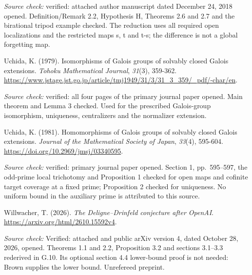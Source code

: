 \documentclass[10pt,a4paper]{article}
\begin{document}
\emph{Source check:} verified: attached author manuscript dated December 24, 2018 opened. Definition/Remark 2.2, Hypothesis H, Theorems 2.6 and 2.7 and the birational tripod example checked. The reduction uses all required open localizations and the restricted maps s, t and t-s; the difference is not a global forgetting map.

Uchida, K. (1979). Isomorphisms of Galois groups of solvably closed Galois extensions. \emph{Tohoku Mathematical Journal}, \emph{31}(3), 359-362. \url{https://www.jstage.jst.go.jp/article/tmj1949/31/3/31_3_359/_pdf/-char/en}.

\emph{Source check:} verified: all four pages of the primary journal paper opened. Main theorem and Lemma 3 checked. Used for the prescribed Galois-group isomorphism, uniqueness, centralizers and the normalizer extension.

Uchida, K. (1981). Homomorphisms of Galois groups of solvably closed Galois extensions. \emph{Journal of the Mathematical Society of Japan}, \emph{33}(4), 595-604. \url{https://doi.org/10.2969/jmsj/03340595}.

\emph{Source check:} verified: primary journal paper opened. Section 1, pp.~595--597, the odd-prime local trichotomy and Proposition 1 checked for open maps and cofinite target coverage at a fixed prime; Proposition 2 checked for uniqueness. No uniform bound in the auxiliary prime is attributed to this source.

Willwacher, T. (2026). \emph{The Deligne--Drinfeld conjecture after OpenAI}. \url{https://arxiv.org/html/2610.15592v4}.

\emph{Source check:} Verified: attached and public arXiv version 4, dated October 28, 2026, opened. Theorems 1.1 and 2.2, Proposition 3.2 and sections 3.1--3.3 rederived in G.10. Its optional section 4.4 lower-bound proof is not needed: Brown supplies the lower bound. Unrefereed preprint.
\end{document}
